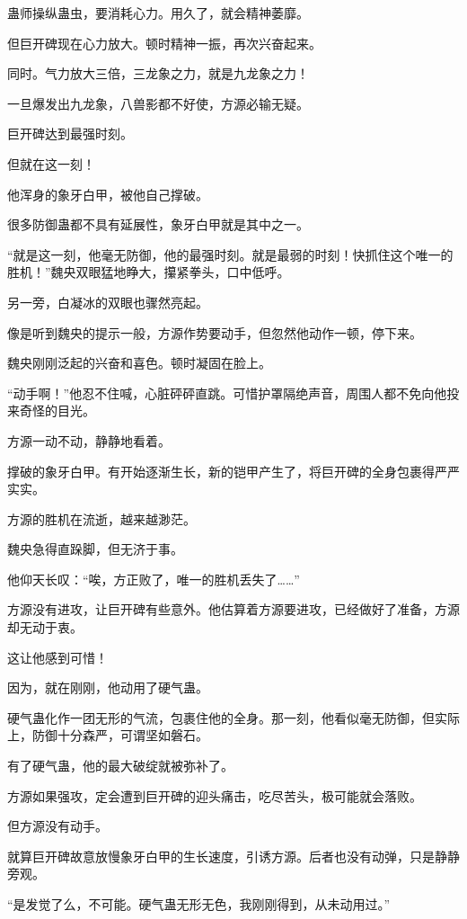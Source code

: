 \begin{this_body}
蛊师操纵蛊虫，要消耗心力。用久了，就会精神萎靡。

但巨开碑现在心力放大。顿时精神一振，再次兴奋起来。

同时。气力放大三倍，三龙象之力，就是九龙象之力！

一旦爆发出九龙象，八兽影都不好使，方源必输无疑。

巨开碑达到最强时刻。

但就在这一刻！

他浑身的象牙白甲，被他自己撑破。

很多防御蛊都不具有延展性，象牙白甲就是其中之一。

“就是这一刻，他毫无防御，他的最强时刻。就是最弱的时刻！快抓住这个唯一的胜机！”魏央双眼猛地睁大，攥紧拳头，口中低呼。

另一旁，白凝冰的双眼也骤然亮起。

像是听到魏央的提示一般，方源作势要动手，但忽然他动作一顿，停下来。

魏央刚刚泛起的兴奋和喜色。顿时凝固在脸上。

“动手啊！”他忍不住喊，心脏砰砰直跳。可惜护罩隔绝声音，周围人都不免向他投来奇怪的目光。

方源一动不动，静静地看着。

撑破的象牙白甲。有开始逐渐生长，新的铠甲产生了，将巨开碑的全身包裹得严严实实。

方源的胜机在流逝，越来越渺茫。

魏央急得直跺脚，但无济于事。

他仰天长叹：“唉，方正败了，唯一的胜机丢失了……”

方源没有进攻，让巨开碑有些意外。他估算着方源要进攻，已经做好了准备，方源却无动于衷。

这让他感到可惜！

因为，就在刚刚，他动用了硬气蛊。

硬气蛊化作一团无形的气流，包裹住他的全身。那一刻，他看似毫无防御，但实际上，防御十分森严，可谓坚如磐石。

有了硬气蛊，他的最大破绽就被弥补了。

方源如果强攻，定会遭到巨开碑的迎头痛击，吃尽苦头，极可能就会落败。

但方源没有动手。

就算巨开碑故意放慢象牙白甲的生长速度，引诱方源。后者也没有动弹，只是静静旁观。

“是发觉了么，不可能。硬气蛊无形无色，我刚刚得到，从未动用过。”


\end{this_body}
